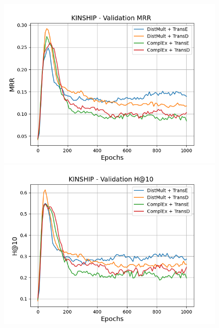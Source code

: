 \begin{figure}[H]
    \centering
    \begin{minipage}{.45\textwidth}
      \centering
      \includegraphics[width=0.9\linewidth]{figures/results/gan_train/not_pretrained/random/kinship/1k_epochs/random_kinship_mrrs.png}
    \end{minipage}%
    \begin{minipage}{.45\textwidth}
      \centering
      \includegraphics[width=0.9\linewidth]{figures/results/gan_train/not_pretrained/random/kinship/1k_epochs/random_kinship_hit10.png}
    \end{minipage}
    

\end{figure}
